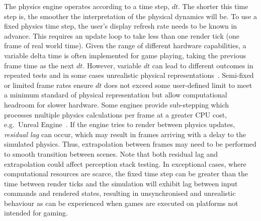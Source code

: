 \documentclass[runningheads,twocolumn,a4paper,10pt]{llncs}
\begin{document}
The physics engine operates according to a time step, $dt$. %
The shorter this time step is, the smoother the interpretation of the physical dynamics will be. %
%
%
To use a fixed physics time step, the user's display refresh rate needs to be known in advance. This requires an update loop to take less than one render tick (one frame of real world time). Given the range of different hardware capabilities, a variable delta time is often implemented for game playing, taking the previous frame time as the next $dt$. However, variable $dt$ can lead to different outcomes in repeated tests and in some cases unrealistic physical representations~\cite{gaffer}. 
%
Semi-fixed or limited frame rates ensure $dt$ does not exceed some user-defined limit to meet a minimum standard of physical representation but allow computational headroom for slower hardware. Some engines provide sub-stepping which processes multiple physics calculations per frame at a greater CPU cost, e.g.\ Unreal Engine~\cite{UE4_substepping}. 
%
If the engine tries to render between physics updates, \textit{residual lag} can occur, which may result in frames arriving with a delay to the simulated physics.
%
Thus, extrapolation between frames may need to be performed to smooth transition between scenes. 
%
Note that both residual lag and extrapolation could affect perception stack testing.
%
%
In exceptional cases, where computational resources are scarce, the fixed time step can be greater than the time between render ticks %
and the simulation will exhibit lag between input commands and rendered states, resulting in unsynchronised and unrealistic behaviour as can be experienced when games are executed on platforms not intended for gaming. 
\end{document}
